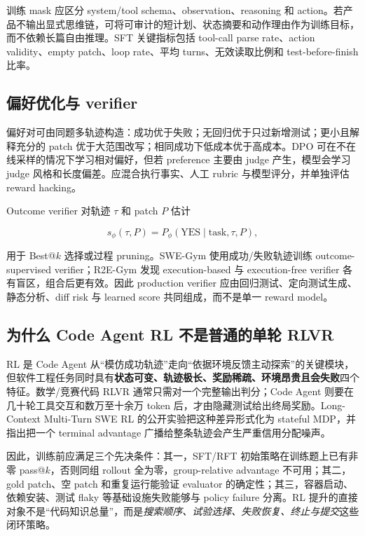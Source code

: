 \documentclass[10pt,a4paper,UTF8,fontset=none]{ctexart}
\begin{document}
训练 mask 应区分 system/tool schema、observation、reasoning 和 action。若产品不输出显式思维链，可将可审计的短计划、状态摘要和动作理由作为训练目标，而不依赖长篇自由推理。SFT 关键指标包括 tool-call parse rate、action validity、empty patch、loop rate、平均 turns、无效读取比例和 test-before-finish 比率。

\subsection{偏好优化与 verifier}

偏好对可由同题多轨迹构造：成功优于失败；无回归优于只过新增测试；更小且解释充分的 patch 优于大范围改写；相同成功下低成本优于高成本。DPO 可在不在线采样的情况下学习相对偏好，但若 preference 主要由 judge 产生，模型会学习 judge 风格和长度偏差。应混合执行事实、人工 rubric 与模型评分，并单独评估 reward hacking。

Outcome verifier 对轨迹 $\tau$ 和 patch $P$ 估计

\begin{equation}
s_{\phi}(\tau,P)=P_{\phi}(\mathrm{YES}\mid \text{task},\tau,P),
\label{eq:verifier}
\end{equation}

用于 Best@$k$ 选择或过程 pruning。SWE-Gym 使用成功/失败轨迹训练 outcome-supervised verifier\cite{pan2024swegym}；R2E-Gym 发现 execution-based 与 execution-free verifier 各有盲区，组合后更有效\cite{jain2025r2egym}。因此 production verifier 应由回归测试、定向测试生成、静态分析、diff risk 与 learned score 共同组成，而不是单一 reward model。

\subsection{为什么 Code Agent RL 不是普通的单轮 RLVR}

RL 是 Code Agent 从“模仿成功轨迹”走向“依据环境反馈主动探索”的关键模块，但软件工程任务同时具有\textbf{状态可变、轨迹极长、奖励稀疏、环境昂贵且会失败}四个特征。数学/竞赛代码 RLVR 通常只需对一个完整输出判分；Code Agent 则要在几十轮工具交互和数万至十余万 token 后，才由隐藏测试给出终局奖励。Long-Context Multi-Turn SWE RL 的公开实验把这种差异形式化为 stateful MDP，并指出把一个 terminal advantage 广播给整条轨迹会产生严重信用分配噪声\cite{golubev2025longcontextrl}。

因此，训练前应满足三个先决条件：其一，SFT/RFT 初始策略在训练题上已有非零 pass@$k$，否则同组 rollout 全为零，group-relative advantage 不可用；其二，gold patch、空 patch 和重复运行能验证 evaluator 的确定性；其三，容器启动、依赖安装、测试 flaky 等基础设施失败能够与 policy failure 分离。RL 提升的直接对象不是“代码知识总量”，而是\emph{搜索顺序、试验选择、失败恢复、终止与提交}这些闭环策略。
\end{document}
